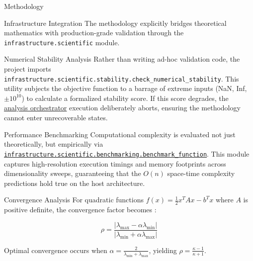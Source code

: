 \documentclass[
  ignorenonframetext,
]{beamer}
\begin{document}
\begin{frame}[fragile]{Methodology}
\begin{block}{Infrastructure Integration}
\protect{}\label{infrastructure-integration}
The methodology explicitly bridges theoretical mathematics with
production-grade validation through the
\texttt{infrastructure.scientific} module.

\begin{block}{Numerical Stability Analysis}
\protect{}\label{numerical-stability-analysis}
Rather than writing ad-hoc validation code, the project imports
\texttt{infrastructure.scientific.stability.check\_numerical\_stability}.
This utility subjects the objective function to a barrage of extreme
inputs (NaN, Inf, \(\pm 10^{10}\)) to calculate a formalized stability
score. If this score degrades, the
\href{https://github.com/docxology/template/blob/main/scripts/02_run_analysis.py}{analysis
orchestrator} execution deliberately aborts, ensuring the methodology
cannot enter unrecoverable states.
\end{block}

\begin{block}{Performance Benchmarking}
\protect{}\label{performance-benchmarking}
Computational complexity is evaluated not just theoretically, but
empirically via
\href{https://github.com/docxology/template/blob/main/infrastructure/scientific/benchmarking.py}{\texttt{infrastructure.scientific.benchmarking.benchmark\_function}}.
This module captures high-resolution execution timings and memory
footprints across dimensionality sweeps, guaranteeing that the \(O(n)\)
space-time complexity predictions hold true on the host architecture.
\end{block}
\end{block}

\begin{block}{Convergence Analysis}
\protect{}\label{convergence-analysis}
For quadratic functions \(f(x) = \frac{1}{2}x^T A x - b^T x\) where
\(A\) is positive definite, the convergence factor becomes
\cite{bertsekas1999nonlinear}:

\begin{equation}
\label{eq:convergence_factor}
\rho = \frac{|\lambda_{\max} - \alpha\lambda_{\min}|}{|\lambda_{\min} + \alpha\lambda_{\max}|}
\end{equation}

Optimal convergence occurs when
\(\alpha = \frac{2}{\lambda_{\min} + \lambda_{\max}}\), yielding
\(\rho = \frac{\kappa - 1}{\kappa + 1}\).
\end{block}


\end{frame}
\end{document}
